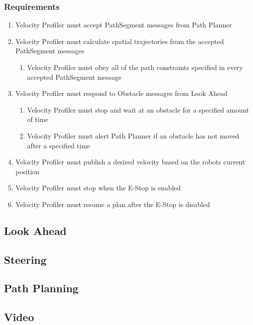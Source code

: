 \subsubsection{Requirements}
\begin{enumerate}
  \item Velocity Profiler must accept PathSegment messages from
    Path Planner
    \item Velocity Profiler must calculate spatial trajectories from
      the accepted PathSegment messages
      \begin{enumerate}
        \item Velocity Profiler must obey all of the path constraints
          specified in every accepted PathSegment message
         \end {enumerate}
\item Velocity Profiler must respond to Obstacle messages from Look
  Ahead
  \begin{enumerate}
    \item Velocity Profiler must stop and wait at an obstacle for a
      specified amount of time
      \item Velocity Profiler must alert Path Planner if an obstacle
        has not moved after a specified time
      \end{enumerate}
      \item Velocity Profiler must publish a desired velocity based on
        the robots current position
      \item Velocity Profiler must stop when the E-Stop is enabled
        \item Velocity Profiler must resume a plan after the E-Stop is
  disabled
  \end{enumerate}
      
\subsection{Look Ahead}

\subsection{Steering}

\subsection{Path Planning}

\subsection{Video}

